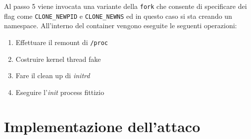 \documentclass[oneside]{article}
\begin{document}
Al passo 5 viene invocata una variante della \texttt{fork} che consente di specificare dei flag come \texttt{CLONE\_NEWPID} e \texttt{CLONE\_NEWNS} ed in questo caso si sta creando un namespace. All'interno del container vengono eseguite le seguenti operazioni:
\begin{multicols}{2}
\begin{enumerate}
\item Effettuare il remount di \texttt{/proc}
\item Costruire kernel thread fake
\item Fare il clean up di \textit{initrd}
\item Eseguire l'\textit{init} process fittizio
\end{enumerate}
\end{multicols}

\section{Implementazione dell'attaco}
\end{document}
